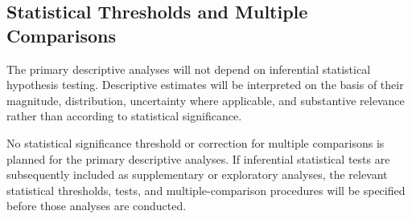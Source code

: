 \subsection{Statistical Thresholds and Multiple Comparisons}

The primary descriptive analyses will not depend on inferential statistical hypothesis testing. Descriptive estimates will be interpreted on the basis of their magnitude, distribution, uncertainty where applicable, and substantive relevance rather than according to statistical significance.

No statistical significance threshold or correction for multiple comparisons is planned for the primary descriptive analyses. If inferential statistical tests are subsequently included as supplementary or exploratory analyses, the relevant statistical thresholds, tests, and multiple-comparison procedures will be specified before those analyses are conducted.

